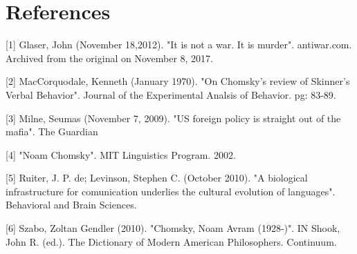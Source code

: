 \documentclass[conference]{IEEEtran}
\begin{document}
\section*{References}


[1] Glaser, John (November 18,2012). "It is not a war. It is murder". antiwar.com. Archived from the original on November 8, 2017.

[2] MacCorquodale, Kenneth (January 1970). "On Chomsky's review of Skinner's Verbal Behavior". Journal of the Experimental Analsis of Behavior. pg: 83-89.

[3] Milne, Seumas (November 7, 2009). "US foreign policy is straight out of the mafia". The Guardian

[4] "Noam Chomsky". MIT Linguistics Program. 2002.

[5] Ruiter, J. P. de; Levinson, Stephen C. (October 2010). "A biological infrastructure for comunication underlies the cultural evolution of languages". Behavioral and Brain Sciences. 

[6] Szabo, Zoltan Gendler (2010). "Chomsky, Noam Avram (1928-)". IN Shook, John R. (ed.). The Dictionary of Modern American Philosophers. Continuum.
\end{document}
